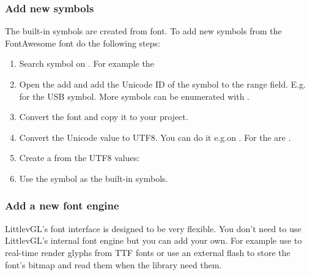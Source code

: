 \documentclass[letterpaper,10pt,english]{sphinxmanual}
\begin{document}
\subsubsection{Add new symbols}
\label{\detokenize{overview/fonts:add-new-symbols}}
The built-in symbols are created from  font. To add new symbols from the FontAwesome font do the following steps:
\begin{enumerate}
\def\theenumi{\arabic{enumi}}
\def\labelenumi{\theenumi .}
\makeatletter\def\p@enumii{\p@enumi \theenumi .}\makeatother
\item {} 
Search symbol on . For example the 

\item {} 
Open the  add  and add the Unicode ID of the symbol to the range field. E.g. for the USB symbol.
More symbols can be enumerated with \sphinxcode{\sphinxupquote{,}}.

\item {} 
Convert the font and copy it to your project.

\item {} 
Convert the Unicode value to UTF8. You can do it e.g.on . For  the  are .

\item {} 
Create a  from the UTF8 values: 

\item {} 
Use the symbol as the built-in symbols. 

\end{enumerate}


\subsubsection{Add a new font engine}
\label{\detokenize{overview/fonts:add-a-new-font-engine}}
LittlevGL’s font interface is designed to be very flexible.
You don’t need to use LittlevGL’s internal font engine but you can add your own.
For example use  to real-time render glyphs from TTF fonts or use an external flash to store the font’s bitmap and read them when the library need them.
\end{document}
